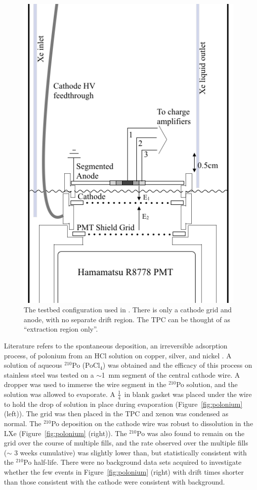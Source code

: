 \begin{figure}[htbp]
\begin{center}
\includegraphics[width=\halffig]{figures/testbed/internals1.png}
\caption{The testbed configuration used in \cite{SorensenKamdin2018}. There is only a cathode grid and anode, with no separate drift region. The \acs{TPC} can be thought of as ``extraction region only''.}
\label{fig:extraction_tpc}
\end{center}
\end{figure}


Literature refers to the spontaneous deposition, an irreversible adsorption process, of polonium from an HCl solution on copper, silver, and nickel \cite{Hashimoto1990} \cite{Figgins1961}. A solution of aqueous $^{210}$Po (PoCl$_{4}$) was obtained and the efficacy of this process on stainless steel was tested on a $\sim$1~mm segment of the central cathode wire. A dropper was used to immerse the wire segment in the $^{210}$Po solution, and the solution was allowed to evaporate. A $\frac{1}{4}$~in blank gasket was placed under the wire to hold the drop of solution in place during evaporation (Figure~\ref{fig:polonium} (left)). The grid was then placed in the \ac{TPC} and xenon was condensed as normal. The $^{210}$Po deposition on the cathode wire was robust to dissolution in the \ac{LXe} (Figure~\ref{fig:polonium} (right)). The $^{210}$Po was also found to remain on the grid over the course of multiple fills, and the rate observed over the multiple fills ($\sim$ 3 weeks cumulative) was slightly lower than, but statistically consistent with the $^{210}$Po half-life. There were no background data sets acquired to investigate whether the few events in Figure~\ref{fig:polonium} (right) with drift times shorter than those consistent with the cathode were consistent with background. 

